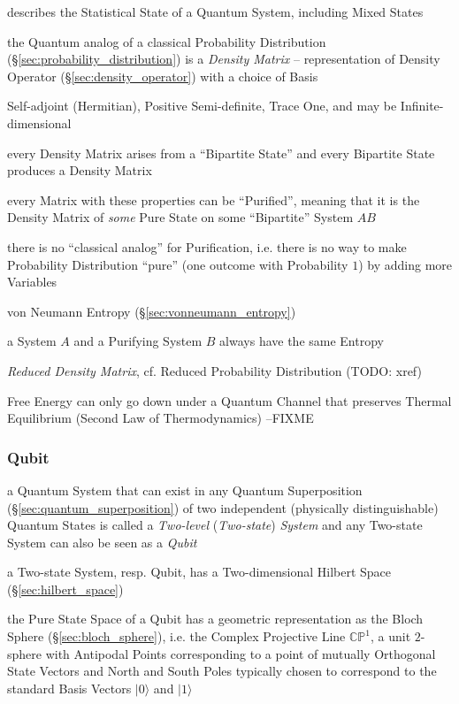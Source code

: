 describes the Statistical State of a Quantum System, including Mixed States

the Quantum analog of a classical Probability Distribution
(\S\ref{sec:probability_distribution}) is a \emph{Density Matrix} --
representation of Density Operator (\S\ref{sec:density_operator}) with a choice
of Basis

Self-adjoint (Hermitian), Positive Semi-definite, Trace One, and may be
Infinite-dimensional

every Density Matrix arises from a ``Bipartite State'' and every Bipartite State
produces a Density Matrix

every Matrix with these properties can be ``Purified'', meaning that it is the
Density Matrix of \emph{some} Pure State on some ``Bipartite'' System $AB$

there is no ``classical analog'' for Purification, i.e. there is no way to make
Probability Distribution ``pure'' (one outcome with Probability $1$) by adding
more Variables

von Neumann Entropy (\S\ref{sec:vonneumann_entropy})

a System $A$ and a Purifying System $B$ always have the same Entropy

\emph{Reduced Density Matrix}, cf. Reduced Probability Distribution (TODO: xref)

Free Energy can only go down under a Quantum Channel that preserves Thermal
Equilibrium (Second Law of Thermodynamics)
--FIXME



\subsubsection{Qubit}\label{sec:qubit}

a Quantum System that can exist in any Quantum Superposition
(\S\ref{sec:quantum_superposition}) of two independent (physically
distinguishable) Quantum States is called a \emph{Two-level} (\emph{Two-state})
\emph{System} and any Two-state System can also be seen as a \emph{Qubit}

a Two-state System, resp. Qubit, has a Two-dimensional Hilbert Space
(\S\ref{sec:hilbert_space})

the Pure State Space of a Qubit has a geometric representation as the Bloch
Sphere (\S\ref{sec:bloch_sphere}), i.e. the Complex Projective Line
$\mathbb{CP}^1$, a unit $2$-sphere with Antipodal Points corresponding to a
point of mutually Orthogonal State Vectors and North and South Poles typically
chosen to correspond to the standard Basis Vectors $|0\rangle$ and $|1\rangle$

